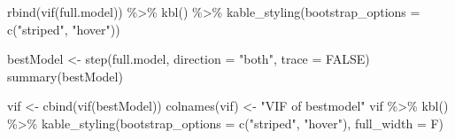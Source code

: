 \documentclass[
]{article}
\newenvironment{Shaded}{\begin{snugshade}}{\end{snugshade}}
\newcommand{\AttributeTok}[1]{\textcolor[rgb]{0.77,0.63,0.00}{#1}}
\newcommand{\ConstantTok}[1]{\textcolor[rgb]{0.00,0.00,0.00}{#1}}
\newcommand{\FunctionTok}[1]{\textcolor[rgb]{0.00,0.00,0.00}{#1}}
\newcommand{\NormalTok}[1]{#1}
\newcommand{\OtherTok}[1]{\textcolor[rgb]{0.56,0.35,0.01}{#1}}
\newcommand{\SpecialCharTok}[1]{\textcolor[rgb]{0.00,0.00,0.00}{#1}}
\newcommand{\StringTok}[1]{\textcolor[rgb]{0.31,0.60,0.02}{#1}}
\begin{document}
\begin{Shaded}
\begin{Highlighting}[]
\FunctionTok{rbind}\NormalTok{(}\FunctionTok{vif}\NormalTok{(full.model))  }\SpecialCharTok{\%\textgreater{}\%}
  \FunctionTok{kbl}\NormalTok{() }\SpecialCharTok{\%\textgreater{}\%}
  \FunctionTok{kable\_styling}\NormalTok{(}\AttributeTok{bootstrap\_options =} \FunctionTok{c}\NormalTok{(}\StringTok{"striped"}\NormalTok{, }\StringTok{"hover"}\NormalTok{))}
\end{Highlighting}
\end{Shaded}

\begin{Shaded}
\begin{Highlighting}[]
\NormalTok{bestModel }\OtherTok{\textless{}{-}} \FunctionTok{step}\NormalTok{(full.model, }\AttributeTok{direction =} \StringTok{"both"}\NormalTok{,}
                  \AttributeTok{trace =} \ConstantTok{FALSE}\NormalTok{)}
\FunctionTok{summary}\NormalTok{(bestModel)}
\end{Highlighting}
\end{Shaded}

\begin{Shaded}
\begin{Highlighting}[]
\NormalTok{vif }\OtherTok{\textless{}{-}} \FunctionTok{cbind}\NormalTok{(}\FunctionTok{vif}\NormalTok{(bestModel))}
\FunctionTok{colnames}\NormalTok{(vif) }\OtherTok{\textless{}{-}} \StringTok{"VIF of bestmodel"}
\NormalTok{vif  }\SpecialCharTok{\%\textgreater{}\%}
  \FunctionTok{kbl}\NormalTok{() }\SpecialCharTok{\%\textgreater{}\%}
  \FunctionTok{kable\_styling}\NormalTok{(}\AttributeTok{bootstrap\_options =} \FunctionTok{c}\NormalTok{(}\StringTok{"striped"}\NormalTok{, }\StringTok{"hover"}\NormalTok{), }\AttributeTok{full\_width =}\NormalTok{ F)}
\end{Highlighting}
\end{Shaded}
\end{document}
